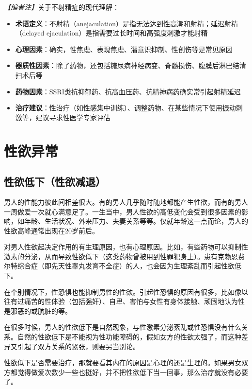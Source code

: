 \documentclass[12pt,a4paper,twoside]{ctexbook}
\begin{document}
\noindent\textit{【编者注】}关于不射精症的现代理解：
\begin{itemize}
	\item \textbf{术语定义}：不射精（anejaculation）是指无法达到性高潮和射精；延迟射精（delayed ejaculation）是指需要过长时间和高强度刺激才能射精
	\item \textbf{心理因素}：确实，性焦虑、表现焦虑、潜意识抑制、性创伤等是常见原因
	\item \textbf{器质性因素}：除了药物，还包括糖尿病神经病变、脊髓损伤、腹膜后淋巴结清扫术后等
	\item \textbf{药物因素}：SSRI类抗抑郁药、抗高血压药、抗精神病药确实常引起射精延迟
	\item \textbf{治疗建议}：性治疗（如性感集中训练）、调整药物、在某些情况下使用振动刺激等，建议寻求性医学专家评估
\end{itemize}

\chapter{性欲异常}

\section{性欲低下（性欲减退）}


男人的性能力彼此间相差很大。有的男人几乎随时随地都能产生性欲，而有的男人一周做爱一次就心满意足了。一生当中，男人性欲的高低变化会受到很多因素的影响，如年龄、生活状况、外来压力、夫妻关系等等。仅就年龄这一点而论，男人的性欲高峰通常出现在20岁前后。

对男人性欲起决定作用的有生理原因，也有心理原因。比如，有些药物可以抑制性激素的分泌，从而导致性欲低下（这类药物曾被用到性罪犯身上）。患有克赖恩费尔特综合症（即先天性睾丸发育不全症）的人，也会因为生理紊乱而引起性欲低下。

在个别情况下，性恐惧也能抑制男性的性欲。引起性恐惧的原因有很多，比如像以往有过痛苦的性体验（包括强奸）、自卑、害怕与女性有身体接触、顽固地认为性是邪恶的或肮脏的等。

在很多时候，男人的性欲低下是自然现象，与性激素分泌紊乱或性恐惧没有什么关系。自然的性欲低下是不能视为性功能障碍的，假如女方的性欲太强了，而这种差异又引起了双方关系的紧张，则要另当别论。

性欲低下是否需要治疗，那就要看其内在的原因是心理的还是生理的。如果男女双方都觉得做爱次数少一些也挺好，并不把性欲低下当一回事，那么治疗就没有必要了。
\end{document}
